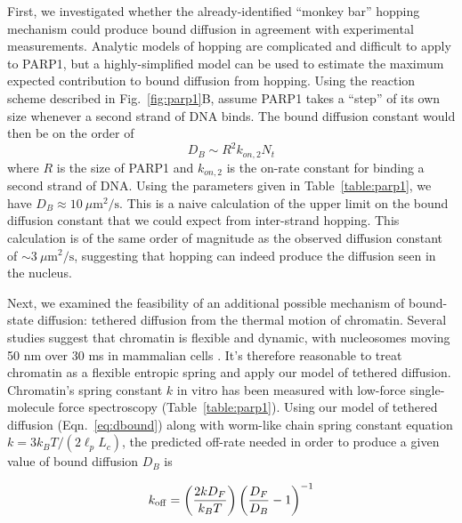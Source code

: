 First, we investigated whether the already-identified ``monkey bar'' hopping mechanism could produce bound diffusion in agreement with experimental measurements.   Analytic models of hopping are complicated and difficult to apply to PARP1\cite{yang18}, but a highly-simplified model can be used to estimate the maximum expected contribution to bound diffusion from hopping.   Using the reaction scheme described in Fig.~\ref{fig:parp1}B, assume PARP1 takes a ``step'' of its own size whenever a second strand of DNA binds.  The bound diffusion constant would then be on the order of $$D_B \sim R^2 k_{on,2} N_t$$ where $R$ is the size of PARP1 and $k_{on,2}$ is the on-rate constant for binding a second strand of DNA.  Using the parameters given in Table~\ref{table:parp1}, we have $D_B \approx 10\ \mu\mathrm{m}^2/\mathrm{s}$.  This is a naive calculation of the upper limit on the bound diffusion constant that we could expect from inter-strand hopping.  This calculation is of the same order of magnitude as the observed diffusion constant of $\sim 3\ \mu\mathrm{m}^2/\mathrm{s}$, suggesting that hopping can indeed produce the diffusion seen in the nucleus.




Next, we examined the feasibility of an additional possible mechanism of bound-state diffusion: tethered diffusion from the thermal motion of chromatin.  Several studies suggest that chromatin is flexible and dynamic, with nucleosomes moving 50 nm over 30 ms in mammalian cells \cite{nozaki17, maeshima16, hihara12,nozaki13}.  It's therefore reasonable to treat chromatin as a flexible entropic spring and apply our model of tethered diffusion.  Chromatin's spring constant $k$ in vitro has been measured with low-force single-molecule force spectroscopy (Table~\ref{table:parp1}).  Using our model of tethered diffusion (Eqn.~\ref{eq:dbound}) along with worm-like chain spring constant equation $k = 3 k_B T/(2\ell_pL_c)$, the predicted off-rate needed in order to produce a given value of bound diffusion $D_B$ is

\begin{equation}
k_{\rm off} = \left(\frac{2kD_F}{k_BT}\right)\left(\frac{D_F}{D_B}-1\right)^{-1}
\end{equation}

